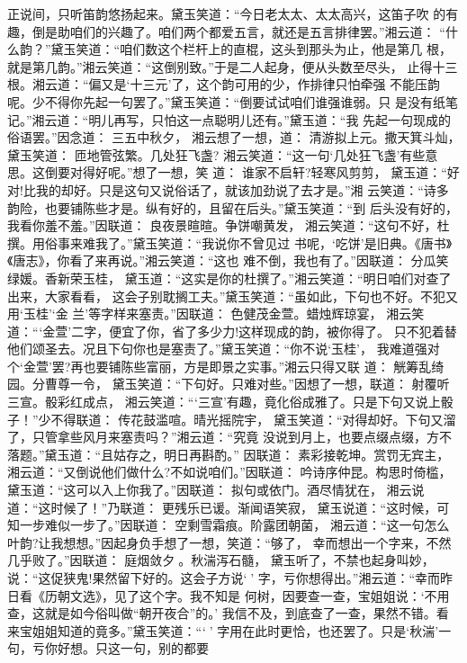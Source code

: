 正说间，只听笛韵悠扬起来。黛玉笑道：“今日老太太、太太高兴，这笛子吹
的有趣，倒是助咱们的兴趣了。咱们两个都爱五言，就还是五言排律罢。”湘云道：
“什么韵？”黛玉笑道：“咱们数这个栏杆上的直棍，这头到那头为止，他是第几
根，就是第几韵。”湘云笑道：“这倒别致。”于是二人起身，便从头数至尽头，
止得十三根。湘云道：“偏又是‘十三元’了，这个韵可用的少，作排律只怕牵强
不能压韵呢。少不得你先起一句罢了。”黛玉笑道：“倒要试试咱们谁强谁弱。只
是没有纸笔记。”湘云道：“明儿再写，只怕这一点聪明儿还有。”黛玉道：“我
先起一句现成的俗语罢。”因念道：
三五中秋夕，
湘云想了一想，道：
清游拟上元。撒天箕斗灿，
黛玉笑道：
匝地管弦繁。几处狂飞盏?
湘云笑道：“这一句‘几处狂飞盏’有些意思。这倒要对得好呢。”想了一想，笑
道：
谁家不启轩?轻寒风剪剪，
黛玉道：“好对!比我的却好。只是这句又说俗话了，就该加劲说了去才是。”湘
云笑道：“诗多韵险，也要铺陈些才是。纵有好的，且留在后头。”黛玉笑道：“到
后头没有好的，我看你羞不羞。”因联道：
良夜景暄暄。争饼嘲黄发，
湘云笑道：“这句不好，杜撰。用俗事来难我了。”黛玉笑道：“我说你不曾见过
书呢，‘吃饼’是旧典。《唐书》《唐志》，你看了来再说。”湘云笑道：“这也
难不倒，我也有了。”因联道：
分瓜笑绿媛。香新荣玉桂，
黛玉道：“这实是你的杜撰了。”湘云笑道：“明日咱们对查了出来，大家看看，
这会子别耽搁工夫。”黛玉笑道：“虽如此，下句也不好。不犯又用‘玉桂’‘金
兰’等字样来塞责。”因联道：
色健茂金萱。蜡烛辉琼宴，
湘云笑道：“‘金萱’二字，便宜了你，省了多少力!这样现成的韵，被你得了。
只不犯着替他们颂圣去。况且下句你也是塞责了。”黛玉笑道：“你不说‘玉桂’，
我难道强对个‘金萱’罢?再也要铺陈些富丽，方是即景之实事。”湘云只得又联
道：
觥筹乱绮园。分曹尊一令，
黛玉笑道：“下句好。只难对些。”因想了一想，联道：
射覆听三宣。骰彩红成点，
湘云笑道：“‘三宣’有趣，竟化俗成雅了。只是下句又说上骰子！”少不得联道：
传花鼓滥喧。晴光摇院宇，
黛玉笑道：“对得却好。下句又溜了，只管拿些风月来塞责吗？”湘云道：“究竟
没说到月上，也要点缀点缀，方不落题。”黛玉道：“且姑存之，明日再斟酌。”
因联道：
素彩接乾坤。赏罚无宾主，
湘云道：“又倒说他们做什么?不如说咱们。”因联道：
吟诗序仲昆。构思时倚槛，
黛玉道：“这可以入上你我了。”因联道：
拟句或依门。酒尽情犹在，
湘云说道：“这时候了！”乃联道：
更残乐已谖。渐闻语笑寂，
黛玉说道：“这时候，可知一步难似一步了。”因联道：
空剩雪霜痕。阶露团朝菌，
湘云道：“这一句怎么叶韵?让我想想。”因起身负手想了一想，笑道：“够了，
幸而想出一个字来，不然几乎败了。”因联道：
庭烟敛夕。秋湍泻石髓，
黛玉听了，不禁也起身叫妙，说：“这促狭鬼!果然留下好的。这会子方说‘’
字，亏你想得出。”湘云道：“幸而昨日看《历朝文选》，见了这个字。我不知是
何树，因要查一查，宝姐姐说：‘不用查，这就是如今俗叫做“朝开夜合”的。’
我信不及，到底查了一查，果然不错。看来宝姐姐知道的竟多。”黛玉笑道：“‘’
字用在此时更恰，也还罢了。只是‘秋湍’一句，亏你好想。只这一句，别的都要
